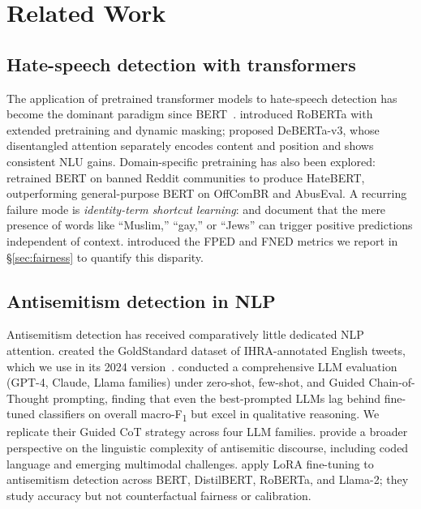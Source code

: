 \documentclass[10pt,a4paper]{article}
\begin{document}
\section{Related Work}
\label{sec:related}

\subsection{Hate-speech detection with transformers}

The application of pretrained transformer models to hate-speech detection has become the dominant paradigm since BERT~\citep{devlin2019bert}. \citet{liu2019roberta} introduced RoBERTa with extended pretraining and dynamic masking; \citet{he2023debertav3} proposed DeBERTa-v3, whose disentangled attention separately encodes content and position and shows consistent NLU gains. Domain-specific pretraining has also been explored: \citet{caselli2021hatebert} retrained BERT on banned Reddit communities to produce HateBERT, outperforming general-purpose BERT on OffComBR and AbusEval. A recurring failure mode is \emph{identity-term shortcut learning}: \citet{vidgen2020directions} and \citet{dixon2018measuring} document that the mere presence of words like ``Muslim,'' ``gay,'' or ``Jews'' can trigger positive predictions independent of context. \citet{dixon2018measuring} introduced the FPED and FNED metrics we report in \S\ref{sec:fairness} to quantify this disparity.

\subsection{Antisemitism detection in NLP}

Antisemitism detection has received comparatively little dedicated NLP attention. \citet{jikeli2023antisemitic} created the GoldStandard dataset of IHRA-annotated English tweets, which we use in its 2024 version~\citep{jikeli2024goldstandard}. \citet{patel2025evaluating} conducted a comprehensive LLM evaluation (GPT-4, Claude, Llama families) under zero-shot, few-shot, and Guided Chain-of-Thought prompting, finding that even the best-prompted LLMs lag behind fine-tuned classifiers on overall macro-F\textsubscript{1} but excel in qualitative reasoning. We replicate their Guided CoT strategy across four LLM families. \citet{becker2025decoding} provide a broader perspective on the linguistic complexity of antisemitic discourse, including coded language and emerging multimodal challenges. \citet{liu2024detecting} apply LoRA fine-tuning to antisemitism detection across BERT, DistilBERT, RoBERTa, and Llama-2; they study accuracy but not counterfactual fairness or calibration.
\end{document}
